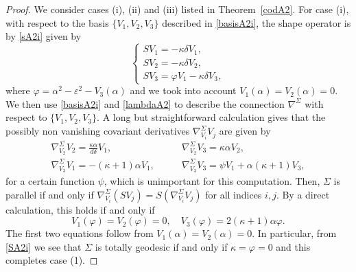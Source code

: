 \documentclass{amsart}
\theoremstyle{plain}
\theoremstyle{remark}
\begin{document}
{\begin{proof}
We consider cases (i), (ii) and (iii) listed in Theorem~\ref{codA2}. For case (i), with respect to the basis $\{V_1,V_2,V_3\}$  described in \eqref{basisA2i}, the shape operator is by \eqref{sA2i} given by
%
\begin{equation} \label{SA2i}
\left\{
\begin{array}{l}
SV_1 =  -\kappa\delta V_1, \\[2 pt]
SV_2 =  -\kappa\delta V_2, \\[2 pt]
SV_3 =  \varphi V_1 - \kappa\delta V_3,
\end{array}
\right.
\end{equation}
%
where $\varphi=\alpha^2- \varepsilon ^2-V_3(\alpha)$ and we took into account $V_1(\alpha)=V_2(\alpha)=0$. We then use \eqref{basisA2i} and \eqref{lambdaA2} to describe the connection $\nabla^{\Sigma}$ with respect to $\{V_1,V_2,V_3\}$. A long but straightforward calculation gives that the possibly non vanishing covariant derivatives $\nabla^\Sigma _{V_i} V_j$ are given by
%
\[
\begin{array}{ll}
\nabla^\Sigma _{V_2} V_2 = \frac{\kappa \alpha}{d\delta} V_1, \qquad &
\nabla^\Sigma _{V_2} V_3 = \kappa \alpha V_2, \\[6 pt]
\nabla^\Sigma _{V_3} V_1 = -(\kappa+1) \alpha V_1, \qquad &
\nabla^\Sigma _{V_3} V_3 = \psi V_1 +\alpha(\kappa+1) V_3,
\end{array}
\]
%
for a certain function $\psi$, which is unimportant for this computation. Then, $\Sigma$ is parallel if and only if $\nabla^\Sigma _{V_i} (SV_j)=S (\nabla^\Sigma _{V_i} V_j)$ for all indices $i,j$. By a direct calculation, this holds if and only if 
\[
V_1(\varphi) = V_2(\varphi) = 0,\quad V_3(\varphi) = 2(\kappa+1)\alpha \varphi.
\]
The first two equations follow from $V_1(\alpha)=V_2(\alpha)=0$. In particular, from \eqref{SA2i} we see that $\Sigma$ is totally geodesic if and only if $\kappa=\varphi=0$ and this completes case (1). 


\end{proof}}
\end{document}
